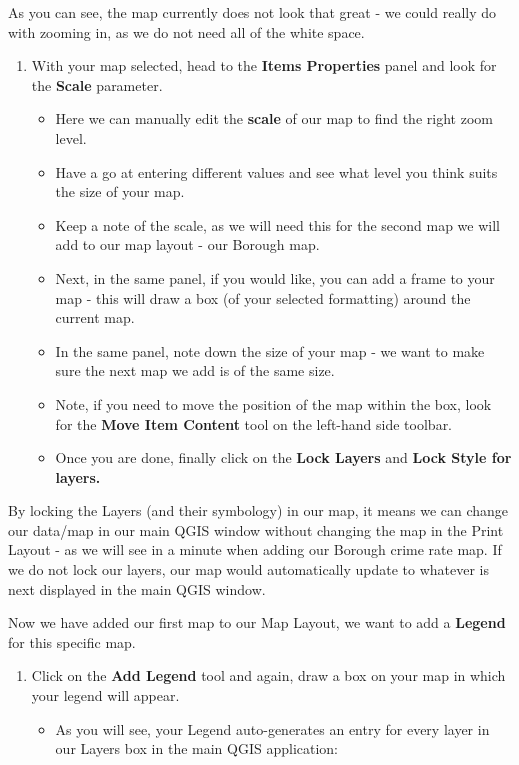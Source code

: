 \documentclass[
]{book}
\providecommand{\tightlist}{%
  \setlength{\itemsep}{0pt}\setlength{\parskip}{0pt}}
\begin{document}
As you can see, the map currently does not look that great - we could really do with zooming in, as we do not need all of the white space.

\begin{enumerate}
\def\labelenumi{\arabic{enumi}.}
\setcounter{enumi}{1}
\tightlist
\item
  With your map selected, head to the \textbf{Items Properties} panel and look for the \textbf{Scale} parameter.

  \begin{itemize}
  \tightlist
  \item
    Here we can manually edit the \textbf{scale} of our map to find the right zoom level.
  \item
    Have a go at entering different values and see what level you think suits the size of your map.
  \item
    Keep a note of the scale, as we will need this for the second map we will add to our map layout - our Borough map.
  \item
    Next, in the same panel, if you would like, you can add a frame to your map - this will draw a box (of your selected formatting) around the current map.
  \item
    In the same panel, note down the size of your map - we want to make sure the next map we add is of the same size.
  \item
    Note, if you need to move the position of the map within the box, look for the \textbf{Move Item Content} tool on the left-hand side toolbar.
  \item
    Once you are done, finally click on the \textbf{Lock Layers} and \textbf{Lock Style for layers.}
  \end{itemize}
\end{enumerate}

By locking the Layers (and their symbology) in our map, it means we can change our data/map in our main QGIS window without changing the map in the Print Layout - as we will see in a minute when adding our Borough crime rate map. If we do not lock our layers, our map would automatically update to whatever is next displayed in the main QGIS window.

Now we have added our first map to our Map Layout, we want to add a \textbf{Legend} for this specific map.

\begin{enumerate}
\def\labelenumi{\arabic{enumi}.}
\setcounter{enumi}{2}
\tightlist
\item
  Click on the \textbf{Add Legend} tool and again, draw a box on your map in which your legend will appear.

  \begin{itemize}
  \tightlist
  \item
    As you will see, your Legend auto-generates an entry for every layer in our Layers box in the main QGIS application:
  \end{itemize}
\end{enumerate}
\end{document}
